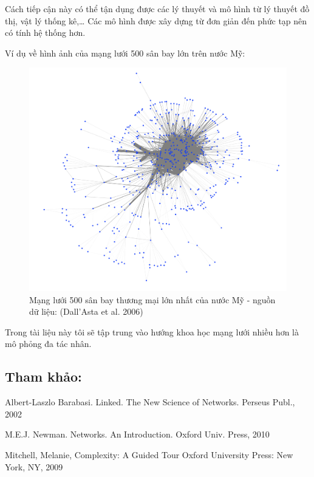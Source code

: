 \documentclass[]{book}
\begin{document}
Cách tiếp cận này có thể tận dụng được các lý thuyết và mô hình từ lý
thuyết đồ thị, vật lý thống kê,\ldots{} Các mô hình được xây dựng từ đơn
giản đến phức tạp nên có tính hệ thống hơn.

Ví dụ về hình ảnh của mạng lưới 500 sân bay lớn trên nước Mỹ:

\begin{figure}

{\centering \includegraphics[width=1\linewidth]{images/US_500airports} 

}

\caption{Mạng lưới 500 sân bay thương mại lớn nhất của nước Mỹ - nguồn dữ liệu: (Dall’Asta et al. 2006)}\label{fig:USairport}
\end{figure}

Trong tài liệu này tôi sẽ tập trung vào hướng khoa học mạng lưới nhiều
hơn là mô phỏng đa tác nhân.

\subsection{Tham khảo:}\label{tham-khao}

Albert-Laszlo Barabasi. Linked. The New Science of Networks. Perseus
Publ., 2002

M.E.J. Newman. Networks. An Introduction. Oxford Univ. Press, 2010

Mitchell, Melanie, Complexity: A Guided Tour Oxford University Press:
New York, NY, 2009
\end{document}
